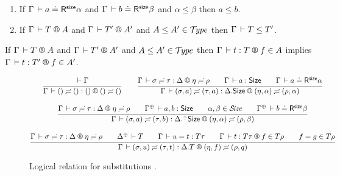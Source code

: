 \documentclass[acmsmall%
]{acmart}\settopmatter{printfolios=true}
\newcommand{\LONGVERSION}[1]{}
\begin{document}
\begin{lemma}
\label{lem:lrsub}
\bla
\begin{enumerate}
\item
   If\/ $\Gamma \,\vdash a \doteq \mathsf{R}^{\mathsf{size}} \alpha$ and $\Gamma \,\vdash b \doteq \mathsf{R}^{\mathsf{size}} \beta$ and $\alpha \leq \beta$ then $a \leq b$.
\item
   If\/ $\RG \Gamma T A$ and $\RG \Gamma {T'} {A'}$ and $A \leq A' \in \mathcal{T}\!\mathit{ype}$ then $\Gamma \,\vdash T \leq T'$.
\end{enumerate}
\end{lemma}
\LONGVERSION{
\begin{proof}
  The proof is analogous to the one  for algorithmic subtyping to come (Lemma~\ref{lem:lrasub}).
\end{proof}
}

\begin{lemma}
\label{lem:lrsump}
   If\/ $\RG \Gamma T A$ and $\RG \Gamma {T'} {A'}$ and $A \leq A' \in \mathcal{T}\!\mathit{ype}$ then
   $\LR \Gamma t T f A$ implies $\LR \Gamma t {T'} f {A'}$.
\end{lemma}


\begin{figure}[htbp]
\hrulefill
\begin{gather*}
  \ru{\der \Gamma
    }{\LRSub \Gamma {\sempty} {\sempty} {\cempty} {\sempty} {\sempty}}
\qquad
  \ru{\LRSub \Gamma \sigma \tau \Delta \eta \rho \qquad
      \Gamma \der a : \Size \qquad
      \LRSize \Gamma a \alpha
    }{\LRSub \Gamma {(\sigma,a)} {(\tau,a)} {\cext \Delta \Size} {(\eta,\alpha)} {(\rho,\alpha)}}
\\[2ex]
  \ru{\LRSub \Gamma \sigma \tau \Delta \eta \rho \qquad
      \resurrect \Gamma \der a, b : \Size \qquad
      \alpha,\beta \in \SIZE \qquad
      \LRSize {\resurrect\Gamma} b \beta
    }{\LRSub \Gamma {(\sigma,a)} {(\tau,b)} {\erext \Delta \Size} {(\eta,\alpha)} {(\rho,\beta)}}
\\[2ex]
  \ru{\LRSub \Gamma \sigma \tau \Delta \eta \rho \qquad
      \resurrect \Delta \der T \qquad
      \Gamma \der u = t : T\tau \qquad
      \LR \Gamma t {T \tau} f {T \rho} \qquad
      f = g \in T\rho
    }{\LRSub \Gamma {(\sigma,u)} {(\tau,t)} {\cext \Delta T} {(\eta,f)} {(\rho,q)}}
\end{gather*}
\hrulefill
\caption{Logical relation for substitutions
  \fbox{$\LRSub \Gamma \sigma \tau \Delta \eta \rho$}.}
\label{fig:lrsub}
\end{figure}
\end{document}
